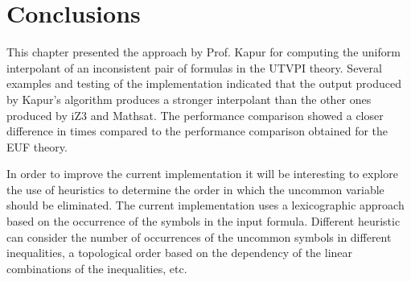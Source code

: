 \section{Conclusions}

This chapter presented the approach
by Prof. Kapur for computing
the uniform interpolant of an inconsistent
pair of formulas in the UTVPI theory.
Several examples and testing of the implementation
indicated that the output produced by Kapur's
algorithm produces a stronger interpolant 
than the other ones produced by iZ3 and Mathsat.
The performance comparison showed a closer
difference in times compared to the performance 
comparison obtained for the EUF theory. 

In order to improve the current implementation it
will be interesting to explore the use of heuristics to 
determine the order in which the uncommon variable 
should be eliminated. The current implementation uses
a lexicographic approach based on the occurrence of the
symbols in the input formula. Different heuristic
can consider the number of occurrences of the uncommon
symbols in different inequalities, a topological order
based on the dependency of the linear combinations of
the inequalities, etc. 


